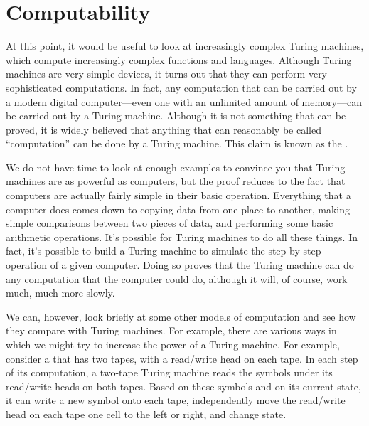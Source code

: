 \section{Computability}\label{S-turing-2}


At this point, it would be useful to look at increasingly complex
Turing machines, which compute increasingly complex functions and languages.
Although Turing machines are very simple devices, it turns out that
they can perform very sophisticated computations.  In fact, any
computation that can be carried out by a modern digital computer---even
one with an unlimited amount of memory---can be carried out by
a Turing machine.  Although it is not something that can be 
proved, it is widely believed that anything that can reasonably
be called ``computation'' can be done by a Turing machine.  This
claim is known as the .

We do not have time to look at enough examples to convince you that
Turing machines are as powerful as computers, but the proof reduces
to the fact that computers are actually fairly simple in their basic
operation.  Everything that a computer does comes down to copying
data from one place to another, making simple comparisons between
two pieces of data, and performing some basic arithmetic operations.
It's possible for Turing machines to do all these things.  In fact,
it's possible to build a Turing machine to simulate the step-by-step
operation of a given computer.  Doing so proves that the Turing machine
can do any computation that the computer could do, although it will,
of course, work much, much more slowly.

\medbreak

We can, however, look briefly at some other models of computation
and see how they compare with Turing machines.  For example, there
are various ways in which we might try to increase the power of
a Turing machine.  For example, consider a 
that has two tapes, with a read/write head on each tape.  In each step
of its computation, a two-tape Turing machine reads the symbols under
its read/write heads on both tapes.
Based on these symbols and on its current state, it
can write a new symbol onto each tape, independently
move the read/write head on each tape one cell to the left or
right, and change state.

